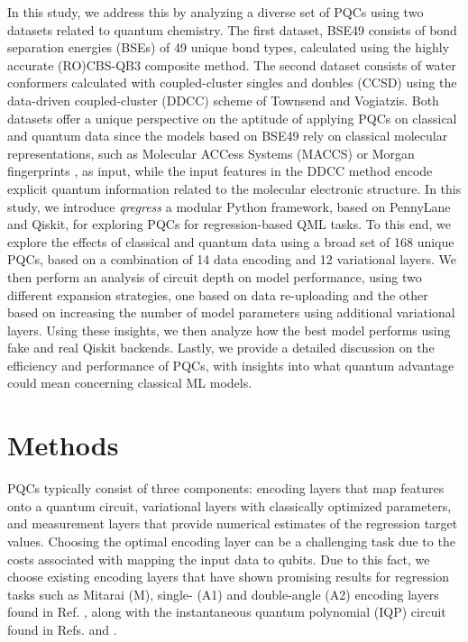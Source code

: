\documentclass[journal=jacsat,manuscript=article]{achemso}
\begin{document}
In this study, we address this by analyzing a diverse set of PQCs using two datasets related to quantum chemistry.
The first dataset, BSE49 consists of bond separation energies (BSEs) of 49 unique bond types, calculated using the highly accurate (RO)CBS-QB3 composite method.\cite{prasad_bse49_2021}
The second dataset consists of water conformers calculated with coupled-cluster singles and doubles (CCSD) using the data-driven coupled-cluster (DDCC) scheme of Townsend and Vogiatzis.\cite{townsend_data-driven_2019,jones_chapter_2023}
Both datasets offer a unique perspective on the aptitude of applying PQCs on classical and quantum data\cite{cerezo_challenges_2022} since the models based on BSE49 rely on classical molecular representations\cite{jones_molecular_2023}, such as Molecular ACCess Systems (MACCS)\cite{durant_reoptimization_2002} or Morgan fingerprints \cite{morgan_generation_1965,rogers_extended-connectivity_2010}, as input, while the input features in the DDCC method encode explicit quantum information related to the molecular electronic structure.
In this study, we introduce \textit{qregress} a modular Python framework, based on PennyLane\cite{bergholm_pennylane_2022} and Qiskit\cite{javadi-abhari_quantum_2024}, for exploring PQCs for regression-based QML tasks.
To this end, we explore the effects of classical and quantum data using a broad set of 168 unique PQCs, based on a combination of 14 data encoding and 12 variational layers.
We then perform an analysis of circuit depth on model performance, using two different expansion strategies, one based on data re-uploading\cite{perez-salinas_data_2020} and the other based on increasing the number of model parameters using additional variational layers.
Using these insights, we then analyze how the best model performs using fake and real Qiskit backends.
Lastly, we provide a detailed discussion on the efficiency and performance of PQCs, with insights into what quantum advantage could mean concerning classical ML models.


\section{Methods}
PQCs typically consist of three components: encoding layers that map features onto a quantum circuit, variational layers with classically optimized parameters, and measurement layers that provide numerical estimates of the regression target values.\citep{suzuki_predicting_2020} 
Choosing the optimal encoding layer can be a challenging task due to the costs associated with mapping the input data to qubits.\cite{biamonte_quantum_2017} 
Due to this fact, we choose existing encoding layers that have shown promising results for regression tasks such as Mitarai (M)\cite{mitarai_quantum_2018}, single- (A1) and double-angle (A2) encoding layers found in Ref. \citep{suzuki_predicting_2020}, along with the instantaneous quantum polynomial (IQP) circuit found in Refs. \citep{bremner_average-case_2016} and \citep{havlicek_supervised_2019}.
\end{document}
